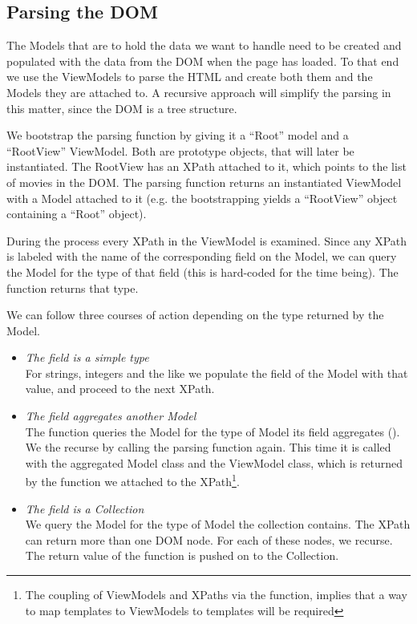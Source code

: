 \documentclass[thesis.tex]{subfiles}
\begin{document}
\subsection{Parsing the DOM}

The Models that are to hold the data we want to handle need to be created and
populated with the data from the DOM when the page has loaded.
To that end we use the ViewModels to parse the HTML and create both them and
the Models they are attached to.
A recursive approach will simplify the parsing in this matter, since the DOM
is a tree structure.

We bootstrap the parsing function by giving it a ``Root'' model and
a ``RootView'' ViewModel.
Both are prototype objects, that will later be instantiated.
The RootView has an XPath attached to it, which points to the list of movies
in the DOM. The parsing function returns an instantiated ViewModel with a Model
attached to it (e.g. the bootstrapping yields a ``RootView'' object containing
a ``Root'' object).

During the process every XPath in the ViewModel is examined.
Since any XPath is labeled with the name of the corresponding field on the
Model, we can query the Model for the type of that field
(this is hard-coded for the time being). The function 
returns that type.

We can follow three courses of action depending on the type
returned by the Model.
\begin{itemize}
	\item \emph{The field is a simple type}\\
	For strings, integers and the like we populate the field of the Model
	with that value, and proceed to the next XPath.
	\item \emph{The field aggregates another Model}\\
	The function queries the Model for the type of Model its field aggregates
	().
	We the recurse by calling the parsing function again.
	This time it is called with the aggregated Model class and
	the ViewModel class, which is returned by the  function
	we attached to the XPath\footnote{The coupling of ViewModels and XPaths
	via the  function, implies that a way to map templates to
	ViewModels to templates will be required}.
	\item \emph{The field is a Collection}\\
	We query the Model for the type of Model the collection contains.
	The XPath can return more than one DOM node.
	For each of these nodes, we recurse.
	The return value of the function is pushed on to the Collection.
\end{itemize}
\end{document}
